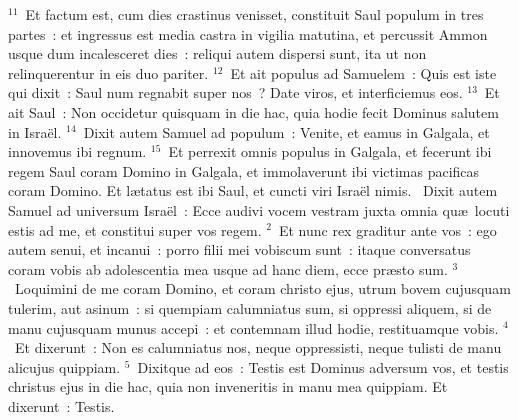 ${}^{11}$~Et factum est, cum dies crastinus venisset, constituit Saul populum in tres partes~: et ingressus est media castra in vigilia matutina, et percussit Ammon usque dum incalesceret dies~: reliqui autem dispersi sunt, ita ut non relinquerentur in eis duo pariter.
${}^{12}$~Et ait populus ad Samuelem~: Quis est iste qui dixit~: Saul num regnabit super nos~? Date viros, et interficiemus eos.
${}^{13}$~Et ait Saul~: Non occidetur quisquam in die hac, quia hodie fecit Dominus salutem in Isra\"el.
${}^{14}$~Dixit autem Samuel ad populum~: Venite, et eamus in Galgala, et innovemus ibi regnum.
${}^{15}$~Et perrexit omnis populus in Galgala, et fecerunt ibi regem Saul coram Domino in Galgala, et immolaverunt ibi victimas pacificas coram Domino. Et l\ae tatus est ibi Saul, et cuncti viri Isra\"el nimis.
~Dixit autem Samuel ad universum Isra\"el~: Ecce audivi vocem vestram juxta omnia qu\ae\ locuti estis ad me, et constitui super vos regem.
${}^{2}$~Et nunc rex graditur ante vos~: ego autem senui, et incanui~: porro filii mei vobiscum sunt~: itaque conversatus coram vobis ab adolescentia mea usque ad hanc diem, ecce pr\ae sto sum.
${}^{3}$~Loquimini de me coram Domino, et coram christo ejus, utrum bovem cujusquam tulerim, aut asinum~: si quempiam calumniatus sum, si oppressi aliquem, si de manu cujusquam munus accepi~: et contemnam illud hodie, restituamque vobis.
${}^{4}$~Et dixerunt~: Non es calumniatus nos, neque oppressisti, neque tulisti de manu alicujus quippiam.
${}^{5}$~Dixitque ad eos~: Testis est Dominus adversum vos, et testis christus ejus in die hac, quia non inveneritis in manu mea quippiam. Et dixerunt~: Testis.


